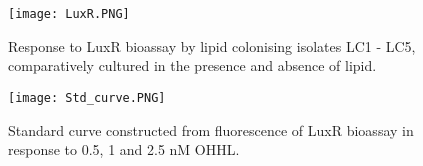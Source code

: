 \documentclass[11pt]{article}
\begin{document}
\begin{figure}
\texttt{[image: LuxR.PNG]}
\caption{Response to LuxR bioassay by lipid colonising isolates LC1 - LC5, comparatively cultured in the presence and absence of lipid.}
\end{figure}

\begin{figure}
\texttt{[image: Std\_curve.PNG]}
\caption{Standard curve constructed from fluorescence of LuxR bioassay in response to 0.5, 1 and 2.5 nM OHHL.}
\end{figure}
\FloatBarrier
\end{document}

